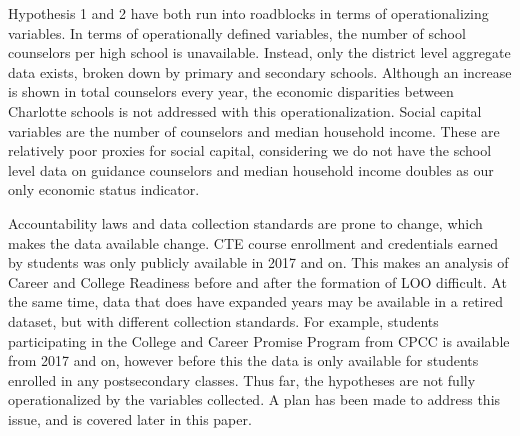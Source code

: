 \vspace{2cm}


Hypothesis 1 and 2 have both run into roadblocks in terms of operationalizing variables. In terms of operationally defined variables, the number of school counselors per high school is unavailable. 
Instead, only the district level aggregate data exists, broken down by primary and secondary schools. 
Although an increase is shown in total counselors every year, the economic disparities between Charlotte schools is not addressed with this operationalization. 
Social capital variables are the number of counselors and median household income. 
These are relatively poor proxies for social capital, considering we do not have the school level data on guidance counselors and median household income doubles as our only economic status indicator. 

Accountability laws and data collection standards are prone to change, which makes the data available change. 
CTE course enrollment and credentials earned by students was only publicly available in 2017 and on. 
This makes an analysis of Career and College Readiness before and after the formation of LOO difficult. 
At the same time, data that does have expanded years may be available in a retired dataset, but with different collection standards. 
For example, students participating in the College and Career Promise Program from CPCC is available from 2017 and on, however before this the data is only available for students enrolled in any postsecondary classes. 
Thus far, the hypotheses are not fully operationalized by the variables collected. 
A plan has been made to address this issue, and is covered later in this paper. 
